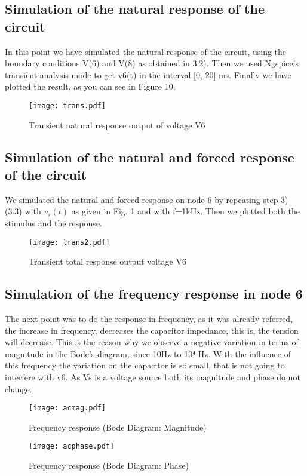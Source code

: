 \subsection{Simulation of the natural response of the circuit}

In this point we have simulated the natural response of the circuit, using the boundary conditions V(6) and V(8) as obtained in 3.2). Then we used Ngspice’s transient analysis mode to get v6(t) in the interval [0, 20] ms. Finally we have plotted the result, as you can see in Figure 10.

\begin{figure}[H] \centering
\texttt{[image: trans.pdf]}
\caption{Transient natural response output of voltage V6}
\label{fig:trans}
\end{figure}

\subsection{Simulation of the natural and forced response of the circuit}


We simulated the natural and forced response on node 6 by repeating step  3) (3.3) with $v_s(t)$ as given in Fig. 1 and with f=1kHz. Then we plotted both the stimulus and the response.

\begin{figure}[H] \centering
\texttt{[image: trans2.pdf]}
\caption{Transient total response output voltage V6}
\label{fig:trans2}
\end{figure}

\newpage
\subsection{Simulation of the frequency response in node 6 } 

The next point was to do the response in frequency, as it was already referred, the increase in frequency, decreases the capacitor impedance, this is, the tension will decrease. This is the reason why we observe a negative variation in terms of magnitude in the Bode's diagram, since 10Hz to 10⁴ Hz. With the influence of this frequency the variation on the capacitor is so small, that is not going to interfere with v6. As Vs is a voltage source both its magnitude and phase do not change.


\begin{figure}[H] \centering
\texttt{[image: acmag.pdf]}
\caption{Frequency response (Bode Diagram: Magnitude)}
\label{fig:acp}
\end{figure}
\begin{figure}[H] \centering
\texttt{[image: acphase.pdf]}
\caption{Frequency response (Bode Diagram: Phase)}
\label{fig:acp}
\end{figure}

\newpage




